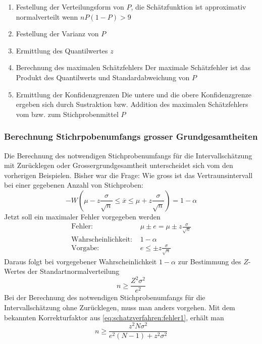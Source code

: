\begin{enumerate}
\item Festellung der Verteilungsform von $P$, die Schätzfunktion ist approximativ normalverteilt wenn $n P(1-P)>9$
\item Festellung der Varianz von $P$
\item Ermittlung des Quantilwertes $z$
\item Berechnung des maximalen Schätzfehlers
\subitem Der maximale Schätzfehler ist das Produkt des Quantilwerts und Standardabweichung von $P$
\item Ermittlung der Konfidenzgrenzen
\subitem Die untere und die obere Konfidenzgrenze ergeben sich durch Sustraktion bzw. Addition des maximalen Schätzfehlers vom bzw. zum Stichprobenmittel $P$
\end{enumerate}
\subsubsection{Berechnung Stichrpobenumfangs grosser Grundgesamtheiten}
Die Berechnung des notwendigen Stichprobenumfangs für die Intervallschätzung mit Zurücklegen oder Grossergrundgesamtheit unterscheidet sich vom den vorherigen Beispielen. Bisher war die Frage: Wie gross ist das Vertraunsintervall bei einer gegebenen Anzahl von Stichproben:
\begin{equation}\label{eq:stichprobenumfang:1}
-W\left(\mu - z \frac{\sigma}{\sqrt{n}}\leq \overline{x}\leq \mu + z \frac{\sigma}{\sqrt{n}}\right)=1-\alpha
\end{equation}
Jetzt soll ein maximaler Fehler vorgegeben werden
\begin{align}
\text{Fehler: }&\mu\pm e = \mu \pm z\frac{\sigma}{\sqrt{n}}\label{eq:schatzverfahren:fehler1} \\ 
\text{Wahrscheinlichkeit: }&1-\alpha\\
\text{Vorgabe: }&e\leq\pm z\frac{\sigma}{\sqrt{n}}
\end{align}
Daraus folgt bei vorgegebener Wahrscheinlichkeit $1-\alpha$ zur Bestimmung des $Z$-Wertes der Standartnormalverteilung
\begin{equation}
n \geq \frac{Z^2\sigma^2}{e^2}
\end{equation}
Bei der Berechnung des notwendigen Stichprobenumfangs für die Intervallschätzung ohne Zurücklegen, muss man anders vorgehen. Mit dem bekannten Korrekturfaktor aus \autoref{eq:schatzverfahren:fehler1}, erhält man
\begin{equation}
n \geq \frac{z^2 N \sigma^2}{e^2(N-1)+z^2\sigma^2}
\end{equation}
